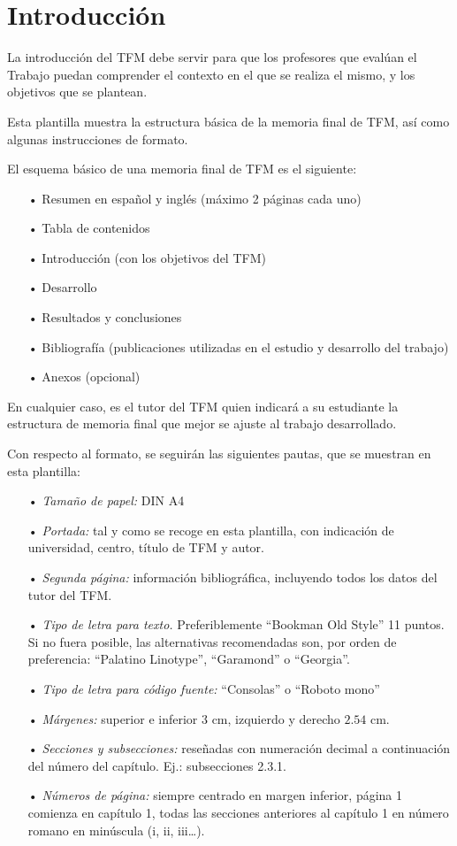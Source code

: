 \chapter{Introducción}
La introducción del TFM debe servir para que los profesores que evalúan el Trabajo puedan comprender el contexto en el que se realiza el mismo, y los objetivos que se plantean.

Esta plantilla muestra la estructura básica de la memoria final de TFM, así como algunas instrucciones de formato.

El esquema básico de una memoria final de TFM es el siguiente:
\begin{itemize}
\item[•] Resumen en español y inglés (máximo 2 páginas cada uno)
\item[•] Tabla de contenidos
\item[•] Introducción (con los objetivos del TFM)
\item[•] Desarrollo
\item[•] Resultados y conclusiones
\item[•] Bibliografía (publicaciones utilizadas en el estudio y desarrollo del trabajo)
\item[•] Anexos (opcional)
\end{itemize}

En cualquier caso, es el tutor del TFM quien indicará a su estudiante la estructura de memoria final que mejor se ajuste al trabajo desarrollado.

Con respecto al formato, se seguirán las siguientes pautas, que se muestran en esta plantilla:
\begin{itemize}
\item[•] \textit{Tamaño de papel:} DIN A4
\item[•] \textit{Portada:} tal y como se recoge en esta plantilla, con indicación de universidad, centro, título de TFM y autor.
\item[•] \textit{Segunda página:} información bibliográfica, incluyendo todos los datos del tutor del TFM.
\item[•] \textit{Tipo de letra para texto.} Preferiblemente “Bookman Old Style” 11 puntos. Si no fuera posible, las alternativas recomendadas son, por orden de preferencia: “Palatino Linotype”, “Garamond” o “Georgia”.
\item[•] \textit{Tipo de letra para código fuente:} “Consolas” o “Roboto mono”
\item[•] \textit{Márgenes:} superior e inferior $3$ cm, izquierdo y derecho $2.54$ cm.
\item[•] \textit{Secciones y subsecciones:} reseñadas con numeración decimal a continuación del número del capítulo. Ej.: subsecciones 2.3.1.
\item[•] \textit{Números de página:} siempre centrado en margen inferior, página 1 comienza en capítulo 1, todas las secciones anteriores al capítulo 1 en número romano en minúscula (i, ii, iii…).
\end{itemize}

